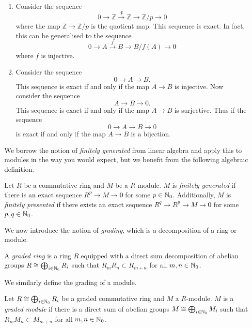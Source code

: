 \begin{example} \hspace{0em}
    \begin{enumerate}
        \item Consider the sequence
              \[ 0 \to \mathbb Z \xrightarrow{\cdot p} \mathbb Z \to \mathbb Z / p \to 0 \]
              where the map $\mathbb Z \to \mathbb Z/p$ is the quotient map. This sequence is exact. In fact, this can be generalised to the sequence
              \[ 0 \to A \xrightarrow{f} B \to B/f(A) \to 0 \]
              where $f$ is injective.
        \item Consider the sequence \[0 \to A \to B.\] This sequence is exact if and only if the map $A \to B$ is injective. Now consider the sequence \[ A \to B \to 0. \] This sequence is exact if and only if the map $A \to B$ is surjective. Thus if the sequence \[ 0 \to A \to B \to 0 \] is exact if and only if the map $A \to B$ is a bijection.
    \end{enumerate}
\end{example}

We borrow the notion of \emph{finitely generated} from linear algebra and apply this to modules in the way you would expect, but we benefit from the following algebraic definition.

\begin{definition}
    Let $R$ be a commutative ring and $M$ be a $R$-module. $M$ is \emph{finitely generated} if there is an exact sequence $R^p \to M \to 0$ for some $p \in \mathbb N_0$. Additionally, $M$ is \emph{finitely presented} if there exists an exact sequence $R^q \to R^p \to M \to 0$ for some $p, q \in \mathbb N_0$.
\end{definition}

We now introduce the notion of \emph{grading}, which is a decomposition of a ring or module.

\begin{definition} \label{def:graded-ring}
    A \emph{graded ring} is a ring $R$ equipped with a direct sum decomposition of abelian groups $R \cong \bigoplus_{i \in \mathbb N_0} R_i$ such that $R_m R_n \subset R_{m+n}$ for all $m,n \in \mathbb N_0$.
\end{definition}

We similarly define the grading of a module.

\begin{definition} \label{def:graded-module}
    Let $R \cong \bigoplus_{i\in \mathbb N_0} R_i$ be a graded commutative ring and $M$ a $R$-module. $M$ is a \emph{graded module} if there is a direct sum of abelian groups $M \cong \bigoplus_{i \in \mathbb N_0} M_i$ such that $R_m M_n \subset M_{m + n}$ for all $m,n \in \mathbb N_0$.
\end{definition}

